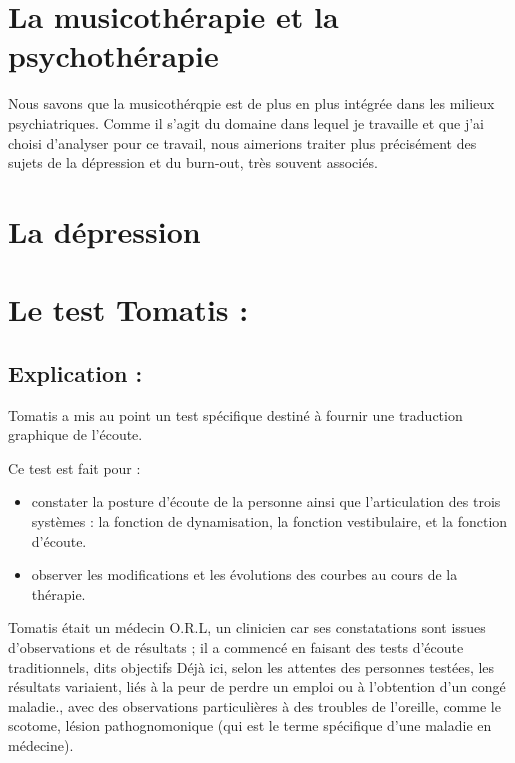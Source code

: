 \documentclass[12pt,french]{report}
\makeatletter
\let\SF@@footnote\footnote
\def\footnote{\ifx\protect\@typeset@protect
    \expandafter\SF@@footnote
  \else
    \expandafter\SF@gobble@opt
  \fi
}
\edef\SF@gobble@opt{\noexpand\protect
  \expandafter\noexpand\csname SF@gobble@opt \endcsname}
\makeatother
\begin{document}
\chapter{La musicothérapie et la psychothérapie}
Nous savons que la musicothérqpie est de plus en plus intégrée dans les milieux psychiatriques.
Comme il s'agit du domaine dans lequel je travaille et que j'ai choisi d'analyser pour ce travail, nous aimerions traiter plus précisément des sujets de la dépression et du burn-out, très  souvent associés.


\chapter{La dépression}

\chapter{Le test Tomatis : }

\section{Explication :}

Tomatis a mis au point un test spécifique destiné à fournir une traduction
graphique de l'écoute.

Ce test est fait pour :
\begin{itemize}
\item constater la posture d'écoute de la personne ainsi que l'articulation
des trois systèmes : la fonction de dynamisation, la fonction vestibulaire,
et la fonction d'écoute.
\item observer les modifications et les évolutions des courbes au cours
de la thérapie.
\end{itemize}
Tomatis était un médecin O.R.L, un clinicien car ses constatations
sont issues d'observations et de résultats ; il a commencé en faisant
des tests d'écoute traditionnels, dits objectifs\footnote{Déjà ici, selon les attentes des personnes testées, les résultats
variaient, liés à la peur de perdre un emploi ou à l'obtention d'un
congé maladie.}, avec des observations particulières à des troubles de l'oreille,
comme le scotome, lésion pathognomonique (qui est le terme spécifique
d'une maladie en médecine). 
\end{document}
